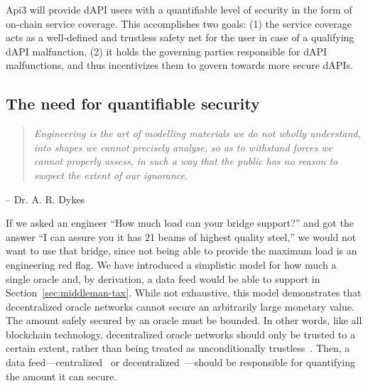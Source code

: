 \documentclass[11pt]{article}
\begin{document}
Api3 will provide dAPI users with a quantifiable level of security in the form of on-chain service coverage.
This accomplishes two goals: (1) the service coverage acts as a well-defined and trustless safety net for the user in case of a qualifying dAPI malfunction, (2) it holds the governing parties responsible for dAPI malfunctions, and thus incentivizes them to govern towards more secure dAPIs.

\subsection{The need for quantifiable security}
\label{sec:the-need-for-quantifiable-security}

\begin{quote}
\it
    Engineering is the art of modelling materials we do not wholly understand, into shapes we cannot precisely analyse, so as to withstand forces we cannot properly assess, in such a way that the public has no reason to suspect the extent of our ignorance.
\end{quote}
\begin{flushright}
-- Dr. A. R. Dykes
\end{flushright}

If we asked an engineer ``How much load can your bridge support?'' and got the answer ``I can assure you it has 21 beams of highest quality steel,'' we would not want to use that bridge, since not being able to provide the maximum load is an engineering red flag.
We have introduced a simplistic model for how much a single oracle and, by derivation, a data feed would be able to support in Section~\ref{sec:middleman-tax}.
While not exhaustive, this model demonstrates that decentralized oracle networks cannot secure an arbitrarily large monetary value.
The amount safely secured by an oracle must be bounded.
In other words, like all blockchain technology, decentralized oracle networks should only be trusted to a certain extent, rather than being treated as unconditionally trustless~\cite{defilippi:2020}.
Then, a data feed---centralized~\cite{coinbase} or decentralized~\cite{ellis:2017}---should be responsible for quantifying the amount it can secure.
\end{document}
